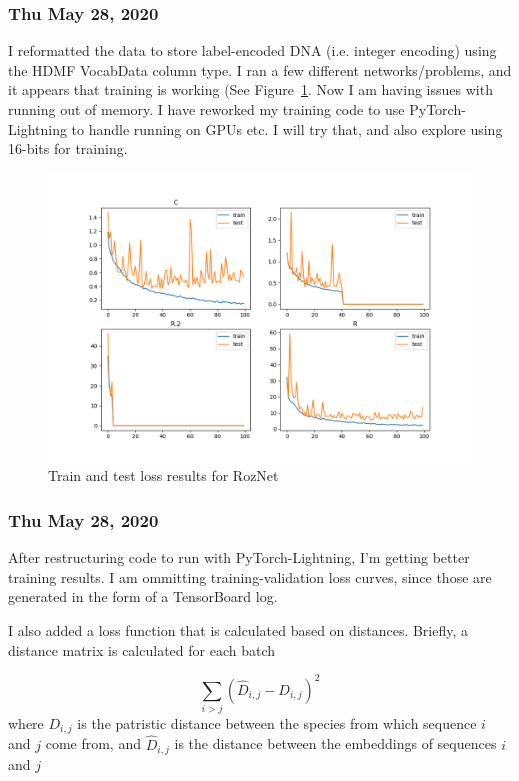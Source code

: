 \documentclass{article}
\begin{document}
\subsubsection*{Thu May 28, 2020}
I reformatted the data to store label-encoded DNA (i.e. integer encoding) using the HDMF VocabData column type. I ran
a few different networks/problems, and it appears that training is working (See Figure~\ref{fig:encoding_fix_results}. Now I am having issues with running out of
memory. I have reworked my training code to use PyTorch-Lightning to handle running on GPUs etc. I will try that, and
also explore using 16-bits for training.

\begin{figure}
  \includegraphics[width=\linewidth]{encoding_fix.results.png}
  \caption{Train and test loss results for RozNet}
  \label{fig:encoding_fix_results}
\end{figure}

\subsubsection*{Thu May 28, 2020}
After restructuring code to run with PyTorch-Lightning, I'm getting better training results. I am ommitting training-validation loss curves, since those are generated in the form of a TensorBoard log.

I also added a loss function that is calculated based on distances. Briefly, a distance matrix is calculated for each batch

\begin{equation}
\sum_{i>j} (\widehat{D}_{i,j} - D_{i,j})^2
\end{equation}
where $D_{i,j}$ is the patristic distance between the species from which sequence $i$ and $j$ come from, and $\widehat{D}_{i,j}$ is the distance between the embeddings of sequences $i$ and $j$
\end{document}
